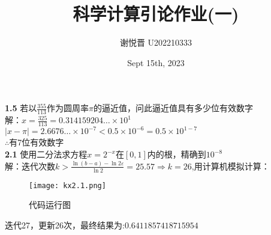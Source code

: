 \documentclass[a4paper,11pt,UTF8]{article}
\title{科学计算引论作业(一)}
\author{谢悦晋 \quad U202210333}
\date{Sept 15th, 2023 }
\begin{document}
\maketitle
\noindent\textbf{1.5} 若以$\displaystyle\frac{355}{113}$作为圆周率$\pi$的逼近值，问此逼近值具有多少位有效数字\\
解：$x=\frac{325}{113}=0.314159204\ldots\times10^1$\\
$|x-\pi|=2.6676\ldots\times10^{-7}<0.5\times10^{-6}=0.5\times10^{1-7}$\\
$\therefore$有7位有效数字\\
\noindent\textbf{2.1} 使用二分法求方程$x=2^{-x}$在$[0,1]$内的根，精确到$10^{-8}$\\
解：迭代次数$\displaystyle k>\frac{\ln(b-a)-\ln2\varepsilon}{\ln2}=25.57\Rightarrow k=26$,用计算机模拟计算：
\begin{figure}[H] 
	\centering 
	\texttt{[image: kx2.1.png]}
	\caption{代码运行图}
\end{figure}
\noindent 迭代27，更新26次，最终结果为:$0.6411857418715954$
\end{document}
